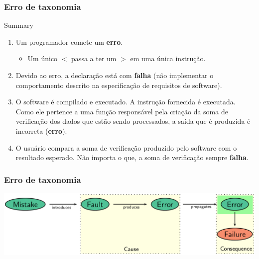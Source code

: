 \begin{frame}
\frametitle{Erro de taxonomia}

\begin{block:procedure}{Summary}
\begin{enumerate}
	\item Um programador comete um \textbf{erro}.
	\begin{itemize}
		\item Um único $<$ passa a ter um $>$ em uma única instrução.
	\end{itemize}

	\item Devido ao erro, a declaração está com \textbf{falha} (não implementar o comportamento descrito na especificação de requisitos de software).

	\item O software é compilado e executado. A instrução fornecida é executada. Como ele pertence a uma função responsável pela criação da soma de verificação dos dados que estão sendo processados, a saída que é produzida é incorreta (\textbf{erro}).

	\item O usuário compara a soma de verificação produzido pelo software com o resultado esperado. Não importa o que, a soma de verificação sempre \textbf{falha}.
\end{enumerate}
\end{block:procedure}
\end{frame}



\begin{frame}[c, hasprev=true, hasnext=false]
\label{concept:defect-taxonomy}
\frametitle{Erro de taxonomia}

\begin{block:fact}{}
    \centering
    \includegraphics[scale=.3]{teste-de-software/conceitos-basicos/Imagens/defect-taxonomy}
\end{block:fact}

\hfill
{}
\end{frame}
